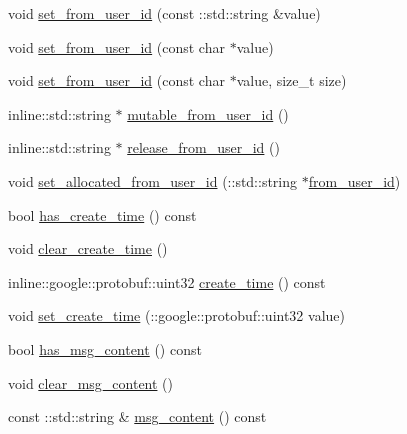 \begin{DoxyCompactItemize}
\item 
void \hyperlink{class_i_m_1_1_base_define_1_1_client_group_msg_a0cd118ed2fbec4ae505302597840d626}{set\+\_\+from\+\_\+user\+\_\+id} (const \+::std\+::string \&value)
\item 
void \hyperlink{class_i_m_1_1_base_define_1_1_client_group_msg_a101f0f88e4eaa72f0746f07e8375bee0}{set\+\_\+from\+\_\+user\+\_\+id} (const char $\ast$value)
\item 
void \hyperlink{class_i_m_1_1_base_define_1_1_client_group_msg_a11961161e0787d0aa8d2e29d36b13d8f}{set\+\_\+from\+\_\+user\+\_\+id} (const char $\ast$value, size\+\_\+t size)
\item 
inline\+::std\+::string $\ast$ \hyperlink{class_i_m_1_1_base_define_1_1_client_group_msg_a59ff6ca6a102df44b73ee80553e6ed9e}{mutable\+\_\+from\+\_\+user\+\_\+id} ()
\item 
inline\+::std\+::string $\ast$ \hyperlink{class_i_m_1_1_base_define_1_1_client_group_msg_a500df1e768e232ff9ee3bdc4c29e5500}{release\+\_\+from\+\_\+user\+\_\+id} ()
\item 
void \hyperlink{class_i_m_1_1_base_define_1_1_client_group_msg_adbea45b62f47fda234ecab166bd67243}{set\+\_\+allocated\+\_\+from\+\_\+user\+\_\+id} (\+::std\+::string $\ast$\hyperlink{class_i_m_1_1_base_define_1_1_client_group_msg_a8560c8f5588d5433e0a220c0b985af71}{from\+\_\+user\+\_\+id})
\item 
bool \hyperlink{class_i_m_1_1_base_define_1_1_client_group_msg_a01fbecfe144e816432cb5cfd211310af}{has\+\_\+create\+\_\+time} () const 
\item 
void \hyperlink{class_i_m_1_1_base_define_1_1_client_group_msg_ae300737ea3257c461e4990648ef2ced9}{clear\+\_\+create\+\_\+time} ()
\item 
inline\+::google\+::protobuf\+::uint32 \hyperlink{class_i_m_1_1_base_define_1_1_client_group_msg_aaad292b94fd01e41e38a5f8ca9d9afbf}{create\+\_\+time} () const 
\item 
void \hyperlink{class_i_m_1_1_base_define_1_1_client_group_msg_a4a232ff2a1729481642473ca54473974}{set\+\_\+create\+\_\+time} (\+::google\+::protobuf\+::uint32 value)
\item 
bool \hyperlink{class_i_m_1_1_base_define_1_1_client_group_msg_a2040bb595b2358006418a93ff9316624}{has\+\_\+msg\+\_\+content} () const 
\item 
void \hyperlink{class_i_m_1_1_base_define_1_1_client_group_msg_ab45569f6cc799005365c225d0ee6cf40}{clear\+\_\+msg\+\_\+content} ()
\item 
const \+::std\+::string \& \hyperlink{class_i_m_1_1_base_define_1_1_client_group_msg_a029b9e20847bb9fd49f895d55ab41a35}{msg\+\_\+content} () const 

\end{DoxyCompactItemize}
